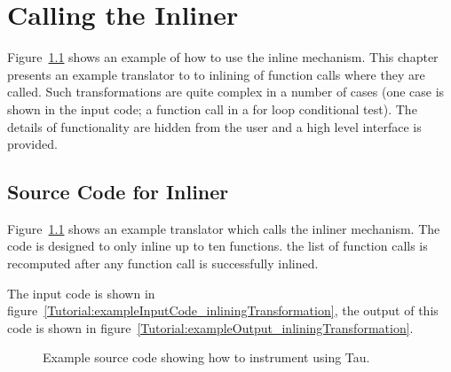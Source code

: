 \chapter{Calling the Inliner}
\label{chap:inliner}

   Figure~\ref{Tutorial:example_inliningTransformation} shows an
example of how to use the inline mechanism.  This chapter presents
an example translator to to inlining of function calls where they
are called.  Such transformations are quite complex in a number of cases
(one case is shown in the input code; a function call in a for loop 
conditional test).  The details of functionality are hidden from the
user and a high level interface is provided.




\section{Source Code for Inliner}

    Figure~\ref{Tutorial:example_inliningTransformation}
shows an example translator which calls the inliner mechanism.
The code is designed to only inline up to ten functions.
the list of function calls is recomputed after any function call
is successfully inlined. 

The input code is shown in figure~\ref{Tutorial:exampleInputCode_inliningTransformation},
the output of this code is shown in 
figure~\ref{Tutorial:exampleOutput_inliningTransformation}.

\begin{figure}[!h]
{\indent
{\mySmallFontSize

\begin{latexonly}
   
\end{latexonly}

\begin{htmlonly}
   
\end{htmlonly}

}
}
\caption{Example source code showing how to instrument using Tau. }
\label{Tutorial:example_inliningTransformation}
\end{figure}





